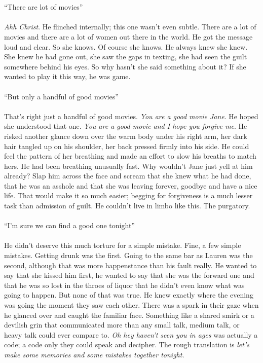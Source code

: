 \\\\
“There are lot of movies”
\\\\
\textit{Ahh Christ}. He flinched internally; this one wasn’t even subtle. There are a lot of movies and there are a lot of women out there in the world. He got the message loud and clear. So she knows. Of course she knows. He always knew she knew. She knew he had gone out, she saw the gaps in texting, she had seen the guilt somewhere behind his eyes. So why hasn’t she said something about it? If she wanted to play it this way, he was game.
\\\\
	“But only a handful of good movies”
\\\\	
That’s right just a handful of good movies. \textit{You are a good movie Jane}. He hoped she understood that one. \textit{You are a good movie and I hope you forgive me}. He risked another glance down over the warm body under his right arm, her dark hair tangled up on his shoulder, her back pressed firmly into his side. He could feel the pattern of her breathing and made an effort to slow his breaths to match hers. He had been breathing unusually fast. Why wouldn’t Jane just yell at him already? Slap him across the face and scream that she knew what he had done, that he was an asshole and that she was leaving forever, goodbye and have a nice life. That would make it so much easier; begging for forgiveness is a much lesser task than admission of guilt. He couldn’t live in limbo like this. The purgatory.
\\\\	
	“I’m sure we can find a good one tonight”
\\\\	
He didn’t deserve this much torture for a simple mistake. Fine, a few simple mistakes. Getting drunk was the first. Going to the same bar as Lauren was the second, although that was more happenstance than his fault really. He wanted to say that she kissed him first, he wanted to say that she was the forward one and that he was so lost in the throes of liquor that he didn’t even know what was going to happen. But none of that was true. He knew exactly where the evening was going the moment they saw each other. There was a spark in their gaze when he glanced over and caught the familiar face. Something like a shared smirk or a devilish grin that communicated more than any small talk, medium talk, or heavy talk could ever compare to. \textit{Oh hey haven’t seen you in ages} was actually a code; a code only they could speak and decipher. The rough translation is \textit{let’s make some memories and some mistakes together tonight.}
